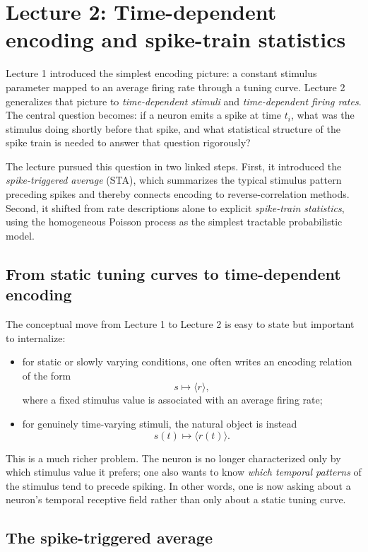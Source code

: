 \documentclass[11pt]{article}
\begin{document}
\clearpage
\section{Lecture 2: Time-dependent encoding and spike-train statistics}

Lecture 1 introduced the simplest encoding picture: a constant stimulus parameter mapped to an average firing rate through a tuning curve. Lecture 2 generalizes that picture to \emph{time-dependent stimuli} and \emph{time-dependent firing rates}. The central question becomes: if a neuron emits a spike at time $t_i$, what was the stimulus doing shortly before that spike, and what statistical structure of the spike train is needed to answer that question rigorously?

The lecture pursued this question in two linked steps. First, it introduced the \emph{spike-triggered average} (STA), which summarizes the typical stimulus pattern preceding spikes and thereby connects encoding to reverse-correlation methods. Second, it shifted from rate descriptions alone to explicit \emph{spike-train statistics}, using the homogeneous Poisson process as the simplest tractable probabilistic model.

\subsection{From static tuning curves to time-dependent encoding}

The conceptual move from Lecture 1 to Lecture 2 is easy to state but important to internalize:
\begin{itemize}
    \item for static or slowly varying conditions, one often writes an encoding relation of the form
    \[
    s \mapsto \langle r \rangle,
    \]
    where a fixed stimulus value is associated with an average firing rate;
    \item for genuinely time-varying stimuli, the natural object is instead
    \[
    s(t) \mapsto \langle r(t) \rangle.
    \]
\end{itemize}

This is a much richer problem. The neuron is no longer characterized only by which stimulus value it prefers; one also wants to know \emph{which temporal patterns} of the stimulus tend to precede spiking. In other words, one is now asking about a neuron's temporal receptive field rather than only about a static tuning curve.

\subsection{The spike-triggered average}
\end{document}
